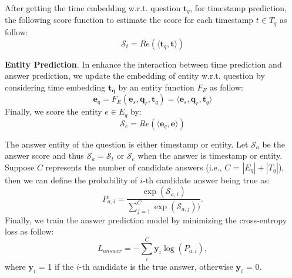 \documentclass[11pt]{article}
\newcommand{\xhdr}[1]{{\noindent\bfseries #1}.}
\newcommand{\gt}[1]{{{\textcolor{cyan}{[gt: #1]}}}}
\begin{document}
After getting the time embedding w.r.t. question $\bm{t}_q$, for timestamp prediction, the following score function to estimate the score for each timestamp $t \in T_q$ as follow:
\begin{equation}
\mathcal{S}_t = Re(\langle \bm{t}_q, \bm{t} \rangle)
\end{equation}


\xhdr{Entity Prediction} In enhance the interaction between time prediction and answer prediction, we update the embedding of entity w.r.t. question by considering time embedding $\bm{t_{q}}$ by an entity function $F_E$ as follow:
\begin{equation}
\bm{e}_q = F_E(\bm{e}_s, \bm{q}_r, \bm{t}_q) = \langle \bm{e}_s, \bm{q}_r, \bm{t}_q \rangle
\end{equation}
Finally, we score the entity $e\in E_{q}$ by:
\begin{equation}
\mathcal{S}_e = Re(\langle \bm{e}_q, \bm{e} \rangle)
\end{equation}


The answer entity of the question is either timestamp or entity. Let $\mathcal{S}_a$ be the answer score and thus $\mathcal{S}_a = \mathcal{S}_t$ or $\mathcal{S}_e$ when the answer is timestamp or entity. Suppose $C$ represents the number of candidate answers (i.e., $C$ = $|E_{q}| + |T_{q}|$), then we can define the probability of $i$-th candidate answer being true as:
\begin{equation}
    P_{a,i} = \frac{\exp(\mathcal{S}_{a,i})}{\sum_{j=1}^{C}\exp(\mathcal{S}_{a,j}))}.
\end{equation}
Finally, we train the answer prediction model by minimizing the cross-entropy loss as follow:
\begin{equation}
    L_{answer}  = -\sum_{i}^{C} \bm{y}_{i} \log(P_{a,i}),
\end{equation}
where $\bm{y}_i$ = 1 if the $i$-th candidate is the true answer, otherwise $\bm{y}_i$ = 0.
\end{document}
